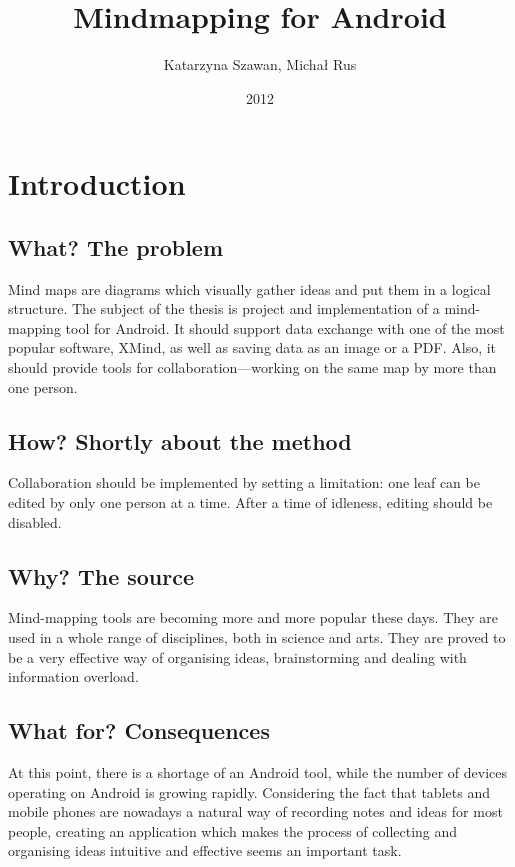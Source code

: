 \documentclass[american]{bsc}
\title{Mindmapping for Android}
\author{Katarzyna Szawan, Michał Rus}
\date{2012}
\begin{document}
\maketitle

\chapter{Introduction}
\label{chap:introduction}

\section{What? The problem}
\label{sec:what}

Mind maps are diagrams which visually gather ideas and put them in a logical structure. The subject of the thesis is project and implementation of a mind-mapping tool for Android. It should support data exchange with one of the most popular software, XMind, as well as saving data as an image or a PDF. Also, it should provide tools for collaboration---working on the same map by more than one person.

\section{How? Shortly about the method}
\label{sec:how}

Collaboration should be implemented by setting a limitation: one leaf can be edited by only one person at a time. After a time of idleness, editing should be disabled.

\section{Why? The source}
\label{sec:why}

Mind-mapping tools are becoming more and more popular these days. They are used in a whole range of disciplines, both in science and arts. They are proved to be a very effective way of organising ideas, brainstorming and dealing with information overload. 

\section{What for? Consequences}
\label{sec:whatfor}

At this point, there is a shortage of an Android tool, while the number of devices operating on Android is growing rapidly. Considering the fact that tablets and mobile phones are nowadays a natural way of recording notes and ideas for most people, creating an application which makes the process of collecting and organising ideas intuitive and effective seems an important task.
\end{document}
